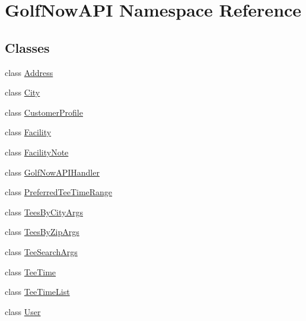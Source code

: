 \hypertarget{namespace_golf_now_a_p_i}{}\section{Golf\+Now\+A\+PI Namespace Reference}
\label{namespace_golf_now_a_p_i}
\subsection*{Classes}
\begin{DoxyCompactItemize}
\item 
class \mbox{\hyperlink{class_golf_now_a_p_i_1_1_address}{Address}}
\item 
class \mbox{\hyperlink{class_golf_now_a_p_i_1_1_city}{City}}
\item 
class \mbox{\hyperlink{class_golf_now_a_p_i_1_1_customer_profile}{Customer\+Profile}}
\item 
class \mbox{\hyperlink{class_golf_now_a_p_i_1_1_facility}{Facility}}
\item 
class \mbox{\hyperlink{class_golf_now_a_p_i_1_1_facility_note}{Facility\+Note}}
\item 
class \mbox{\hyperlink{class_golf_now_a_p_i_1_1_golf_now_a_p_i_handler}{Golf\+Now\+A\+P\+I\+Handler}}
\item 
class \mbox{\hyperlink{class_golf_now_a_p_i_1_1_preferred_tee_time_range}{Preferred\+Tee\+Time\+Range}}
\item 
class \mbox{\hyperlink{class_golf_now_a_p_i_1_1_tees_by_city_args}{Tees\+By\+City\+Args}}
\item 
class \mbox{\hyperlink{class_golf_now_a_p_i_1_1_tees_by_zip_args}{Tees\+By\+Zip\+Args}}
\item 
class \mbox{\hyperlink{class_golf_now_a_p_i_1_1_tee_search_args}{Tee\+Search\+Args}}
\item 
class \mbox{\hyperlink{class_golf_now_a_p_i_1_1_tee_time}{Tee\+Time}}
\item 
class \mbox{\hyperlink{class_golf_now_a_p_i_1_1_tee_time_list}{Tee\+Time\+List}}
\item 
class \mbox{\hyperlink{class_golf_now_a_p_i_1_1_user}{User}}
\end{DoxyCompactItemize}
